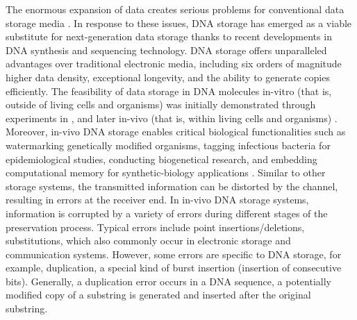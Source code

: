 \documentclass[pdflatex,sn-mathphys-num]{sn-jnl}
\theoremstyle{theorem}%
\theoremstyle{definition}
\theoremstyle{construction}
\newtheorem{open problem}{Open problem}
\begin{document}
The enormous expansion of data creates serious problems for conventional data storage media \cite{Reinsel2020}. In response to these issues, DNA storage has emerged as a viable substitute for next-generation data storage thanks to recent developments in DNA synthesis and sequencing technology. DNA storage offers unparalleled advantages over traditional electronic media, including six orders of magnitude higher data density, exceptional longevity, and the ability to generate copies efficiently. The feasibility of data storage in DNA molecules in-vitro (that is, outside of living cells and organisms) was initially demonstrated through experiments in \cite{cg, gb}, and later in-vivo (that is, within living cells and organisms) \cite{sn}. Moreover, in-vivo DNA storage enables critical biological functionalities such as watermarking genetically modified organisms, tagging infectious bacteria for epidemiological studies, conducting biogenetical research, and embedding computational memory for synthetic-biology applications \cite{Jupiter}. Similar to other storage systems, the transmitted information can be distorted by the channel, resulting in errors at the receiver end. In in-vivo DNA storage systems, information is corrupted by a variety of errors during different stages of the preservation process. Typical errors include point insertions/deletions, substitutions, which also commonly occur in electronic storage and communication systems. However, some errors are specific to DNA storage, for example, duplication, a special kind of burst insertion (insertion of consecutive bits). Generally, a duplication error occurs in a DNA sequence, a potentially modified copy of a substring is generated and inserted after the original substring.  \par 
\end{document}
